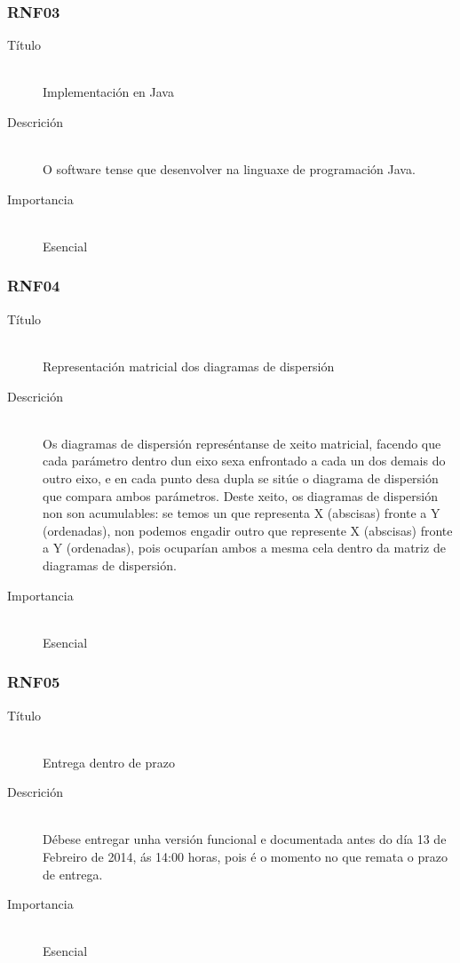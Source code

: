 \subsubsection*{RNF03}
\begin{description}
\item[Título] \hfill \\
Implementación en Java
\item[Descrición] \hfill \\
O software tense que desenvolver na linguaxe de programación Java.
\item[Importancia] \hfill \\
Esencial
\end{description}

\subsubsection*{RNF04}
\begin{description}
\item[Título] \hfill \\
Representación matricial dos diagramas de dispersión
\item[Descrición] \hfill \\
Os diagramas de dispersión represéntanse de xeito matricial, facendo que cada parámetro dentro dun eixo sexa enfrontado a cada un dos demais do outro eixo, e en cada punto desa dupla se sitúe o diagrama de dispersión que compara ambos parámetros. Deste xeito, os diagramas de dispersión non son acumulables: se temos un que representa X (abscisas) fronte a Y (ordenadas), non podemos engadir outro que represente X (abscisas) fronte a Y (ordenadas), pois ocuparían ambos a mesma cela dentro da matriz de diagramas de dispersión.
\item[Importancia] \hfill \\
Esencial
\end{description}

\subsubsection*{RNF05}
\begin{description}
\item[Título] \hfill \\
Entrega dentro de prazo
\item[Descrición] \hfill \\
Débese entregar unha versión funcional e documentada antes do día 13 de Febreiro de 2014, ás 14:00 horas, pois é o momento no que remata o prazo de entrega.
\item[Importancia] \hfill \\
Esencial
\end{description}

